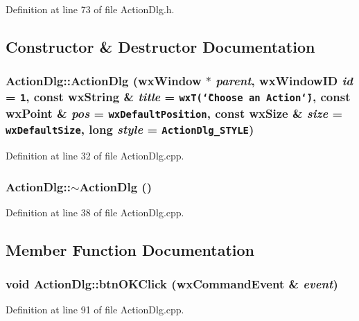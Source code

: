 Definition at line 73 of file Action\-Dlg.h.

\subsection{Constructor \& Destructor Documentation}
\subsubsection{\setlength{\rightskip}{0pt plus 5cm}Action\-Dlg::Action\-Dlg (wx\-Window $\ast$ {\em parent}, wx\-Window\-ID {\em id} = {\tt 1}, const wx\-String \& {\em title} = {\tt wxT(\char`\"{}Choose~an~Action\char`\"{})}, const wx\-Point \& {\em pos} = {\tt wxDefaultPosition}, const wx\-Size \& {\em size} = {\tt wxDefaultSize}, long {\em style} = {\tt ActionDlg\_\-STYLE})}\label{class_action_dlg_5a20e3a1bfa63b2c85d719fbfa5ba828}




Definition at line 32 of file Action\-Dlg.cpp.
\subsubsection{\setlength{\rightskip}{0pt plus 5cm}Action\-Dlg::$\sim$Action\-Dlg ()\hspace{0.3cm}{\tt  [virtual]}}\label{class_action_dlg_027cc32eecf77b94a7fa641cd9660b0f}




Definition at line 38 of file Action\-Dlg.cpp.

\subsection{Member Function Documentation}
\subsubsection{\setlength{\rightskip}{0pt plus 5cm}void Action\-Dlg::btn\-OKClick (wx\-Command\-Event \& {\em event})}\label{class_action_dlg_fd0a42d6c02517174036717008234714}




Definition at line 91 of file Action\-Dlg.cpp.

